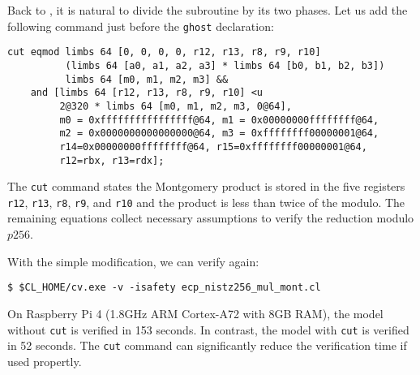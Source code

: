 \documentclass{amsproc}
\begin{document}
Back to \nistzmul, it is natural to divide the subroutine by its two
phases. Let us add the following command just before the
\texttt{ghost} declaration:
\begin{verbatim}
cut eqmod limbs 64 [0, 0, 0, 0, r12, r13, r8, r9, r10]
          (limbs 64 [a0, a1, a2, a3] * limbs 64 [b0, b1, b2, b3])
          limbs 64 [m0, m1, m2, m3] &&
    and [limbs 64 [r12, r13, r8, r9, r10] <u
         2@320 * limbs 64 [m0, m1, m2, m3, 0@64],
         m0 = 0xffffffffffffffff@64, m1 = 0x00000000ffffffff@64,
         m2 = 0x0000000000000000@64, m3 = 0xffffffff00000001@64,
         r14=0x00000000ffffffff@64, r15=0xffffffff00000001@64,
         r12=rbx, r13=rdx];
\end{verbatim}
The \texttt{cut} command states the Montgomery product is stored in
the five registers \texttt{r12}, \texttt{r13}, \texttt{r8},
\texttt{r9}, and \texttt{r10} and the product is less than twice of
the modulo. The remaining equations collect necessary assumptions to
verify the reduction modulo $p256$.

With the simple modification, we can verify \nistzmulcl again:
\begin{verbatim}
$ $CL_HOME/cv.exe -v -isafety ecp_nistz256_mul_mont.cl
\end{verbatim}
On Raspberry Pi 4 (1.8GHz ARM Cortex-A72 with 8GB RAM), the model
without \texttt{cut} is verified in 153 seconds. In contrast, the
model with \texttt{cut} is verified in 52 seconds. The \texttt{cut}
command can significantly reduce the verification time if used
propertly.
\end{document}
